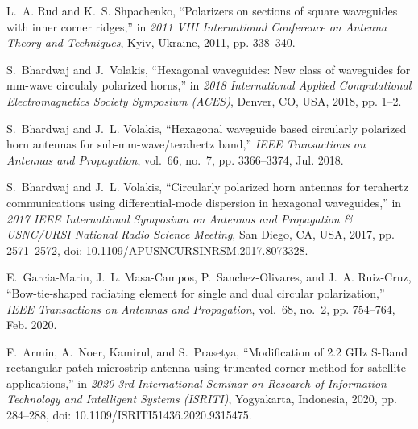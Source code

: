 \documentclass[journal]{IEEEtran}
\begin{document}
\begin{thebibliography}{24}
    L.~A. Rud and K.~S. Shpachenko, ``Polarizers on sections of square waveguides with inner corner ridges,'' in \emph{2011 VIII International Conference on Antenna Theory and Techniques}, Kyiv, Ukraine, 2011, pp. 338--340.
    
    S.~Bhardwaj and J.~Volakis, ``Hexagonal waveguides: New class of waveguides for mm-wave circulaly polarized horns,'' in \emph{2018 International Applied Computational Electromagnetics Society Symposium (ACES)}, Denver, CO, USA, 2018, pp. 1--2.
    
    S.~Bhardwaj and J.~L. Volakis, ``Hexagonal waveguide based circularly polarized horn antennas for sub-mm-wave/terahertz band,'' \emph{IEEE Transactions on Antennas and Propagation}, vol.~66, no.~7, pp. 3366--3374, Jul. 2018.
    
    S.~Bhardwaj and J.~L. Volakis, ``Circularly polarized horn antennas for terahertz communications using differential-mode dispersion in hexagonal waveguides,'' in \emph{2017 IEEE International Symposium on Antennas and Propagation \& USNC/URSI National Radio Science Meeting}, San Diego, CA, USA, 2017, pp. 2571--2572, doi: 10.1109/APUSNCURSINRSM.2017.8073328.
    
    E.~Garcia-Marin, J.~L. Masa-Campos, P.~Sanchez-Olivares, and J.~A. Ruiz-Cruz, ``Bow-tie-shaped radiating element for single and dual circular polarization,'' \emph{IEEE Transactions on Antennas and Propagation}, vol.~68, no.~2, pp. 754--764, Feb. 2020.
    
    F.~Armin, A.~Noer, Kamirul, and S.~Prasetya, ``Modification of 2.2 GHz S-Band rectangular patch microstrip antenna using truncated corner method for satellite applications,'' in \emph{2020 3rd International Seminar on Research of Information Technology and Intelligent Systems (ISRITI)}, Yogyakarta, Indonesia, 2020, pp. 284--288, doi: 10.1109/ISRITI51436.2020.9315475.


\end{thebibliography}
\end{document}
